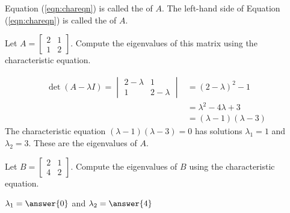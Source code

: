 \documentclass{ximera}
\begin{document}
\begin{definition}
Equation (\ref{eqn:chareqn}) is called the  of $A$.  The left-hand side of Equation (\ref{eqn:chareqn}) is called the  of $A$.
\end{definition}

\begin{example}\label{ex:2x2eig}
Let $A=\begin{bmatrix} 2& 1\\ 1&2
\end{bmatrix}$.  Compute the eigenvalues of this matrix using the characteristic equation.


\begin{explanation}
\begin{align*}\det(A-\lambda I)=\begin{vmatrix}2-\lambda&1\\1&2-\lambda\end{vmatrix}&=(2-\lambda)^2-1\\
&=\lambda^2-4\lambda+3\\
&=(\lambda-1)(\lambda-3)
\end{align*}
The characteristic equation $(\lambda-1)(\lambda-3)=0$ has solutions $\lambda_1=1$ and $\lambda_2=3$.  These are the eigenvalues of $A$.
\end{explanation}
\end{example}

\begin{example}\label{ex:2x2eig2}
Let $B=\begin{bmatrix} 2& 1\\ 4&2
\end{bmatrix}$.  Compute the eigenvalues of $B$ using the characteristic equation.

$\lambda_1=\answer{0}$ and $\lambda_2=\answer{4}$
\end{example}
\end{document}
